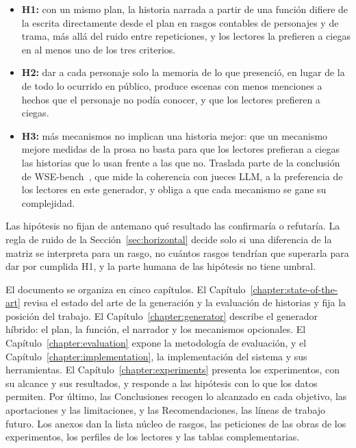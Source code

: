 \begin{introduction}
\begin{itemize}
  \item \textbf{H1:} con un mismo plan, la historia narrada a partir de una función difiere de la
  escrita directamente desde el plan en rasgos contables de personajes y de trama, más allá del
  ruido entre repeticiones, y los lectores la prefieren a ciegas en al menos uno de los tres
  criterios.
  \item \textbf{H2:} dar a cada personaje solo la memoria de lo que presenció, en lugar de la de
  todo lo ocurrido en público, produce escenas con menos menciones a hechos que el personaje no
  podía conocer, y que los lectores prefieren a ciegas.
  \item \textbf{H3:} más mecanismos no implican una historia mejor: que un mecanismo mejore medidas
  de la prosa no basta para que los lectores prefieran a ciegas las historias que lo usan frente a
  las que no. Traslada parte de la conclusión de WSE-bench~\cite{chen2026b}, que mide la coherencia
  con jueces LLM, a la preferencia de los lectores en este generador, y obliga a que cada mecanismo se
  gane su complejidad.
\end{itemize}

Las hipótesis no fijan de antemano qué resultado las confirmaría o refutaría. La regla de ruido de la
Sección~\ref{sec:horizontal} decide solo si una diferencia de la matriz se interpreta para un rasgo,
no cuántos rasgos tendrían que superarla para dar por cumplida H1, y la parte humana de las
hipótesis no tiene umbral.

El documento se organiza en cinco capítulos. El Capítulo~\ref{chapter:state-of-the-art} revisa el
estado del arte de la generación y la evaluación de historias y fija la posición del trabajo. El
Capítulo~\ref{chapter:generator} describe el generador híbrido: el plan, la función, el narrador y
los mecanismos opcionales. El Capítulo~\ref{chapter:evaluation} expone la metodología de
evaluación, y el Capítulo~\ref{chapter:implementation}, la implementación del sistema y sus
herramientas. El Capítulo~\ref{chapter:experiments} presenta los experimentos, con su alcance y sus
resultados, y responde a las hipótesis con lo que los datos permiten. Por último, las
Conclusiones recogen lo alcanzado en cada objetivo, las aportaciones y las limitaciones, y las
Recomendaciones, las líneas de trabajo futuro. Los anexos dan la lista núcleo de rasgos, las
peticiones de las obras de los experimentos, los perfiles de los lectores y las tablas complementarias.
\end{introduction}
